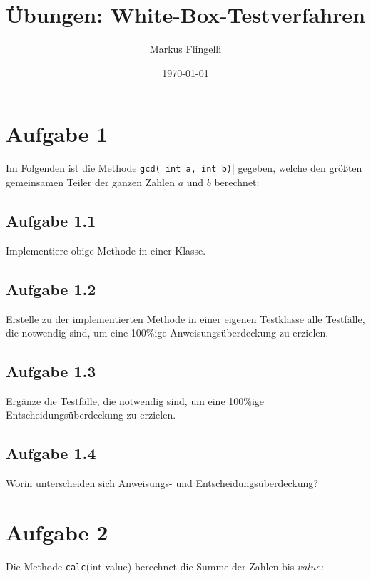 

\title{Übungen: White-Box-Testverfahren}
\author{Markus Flingelli}
\date{\today}


\maketitle

\section*{Aufgabe 1}
Im Folgenden ist die Methode \lstinline{gcd( int a, int b)}| gegeben, welche den größten gemeinsamen Teiler der ganzen Zahlen $a$ und $b$ berechnet:



\subsection*{Aufgabe 1.1}

Implementiere obige Methode in einer Klasse.

\subsection*{Aufgabe 1.2}

Erstelle zu der implementierten Methode in einer eigenen Testklasse alle Testfälle, die notwendig sind, um eine 100\%ige Anweisungsüberdeckung zu erzielen.

\subsection*{Aufgabe 1.3}

Ergänze die Testfälle, die notwendig sind, um eine 100\%ige Entscheidungsüberdeckung zu erzielen.

\subsection*{Aufgabe 1.4}

Worin unterscheiden sich Anweisungs- und Entscheidungsüberdeckung? 

\newpage
\section*{Aufgabe 2}
Die Methode \lstinline{calc}(int value) berechnet die Summe der Zahlen bis $value$:




